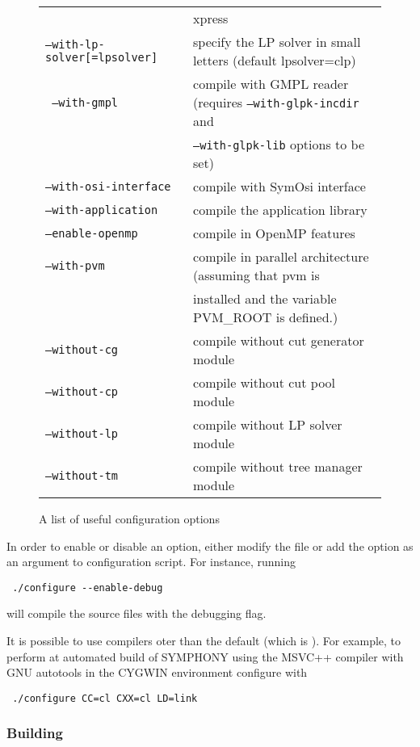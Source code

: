 \begin{figure}[htb]
\begin{tabular}{ll}
& xpress \\
\texttt{--with-lp-solver[=lpsolver]} &  specify the LP solver in small 
letters (default lpsolver=clp) \\
\texttt{ --with-gmpl} &  compile with GMPL reader (requires 
\texttt{--with-glpk-incdir} and \\ &
\texttt{--with-glpk-lib} options to be set) \\
\texttt{--with-osi-interface} &  compile with SymOsi interface \\
\texttt{--with-application} &  compile the application library \\
\hline
\texttt{--enable-openmp} &   compile in OpenMP features \\
\texttt{--with-pvm } &  compile in parallel architecture (assuming that pvm is \\ 
&installed and the variable PVM\_ROOT is defined.) \\
\texttt{--without-cg} &  compile without cut generator module \\
\texttt{--without-cp} &  compile without cut pool module \\
\texttt{--without-lp} &  compile without LP solver module \\
\texttt{--without-tm} &  compile without tree manager module
\end{tabular}
\caption{A list of useful configuration options \label{conf_opts}}
\end{figure}

In order to enable or disable an option, either modify the file
 or add the option as an argument to configuration
script. For instance, running 
{\color{Brown}
\begin{verbatim}
 ./configure --enable-debug
\end{verbatim}
}
will compile the source files with the debugging flag.

It is possible to use compilers oter than the default (which is ).
For example, to perform at automated build of SYMPHONY using the MSVC++
compiler  with GNU autotools in the CYGWIN environment configure with
{\color{Brown}
\begin{verbatim}
 ./configure CC=cl CXX=cl LD=link
\end{verbatim}
}

\subsubsection{Building}\label{building}

